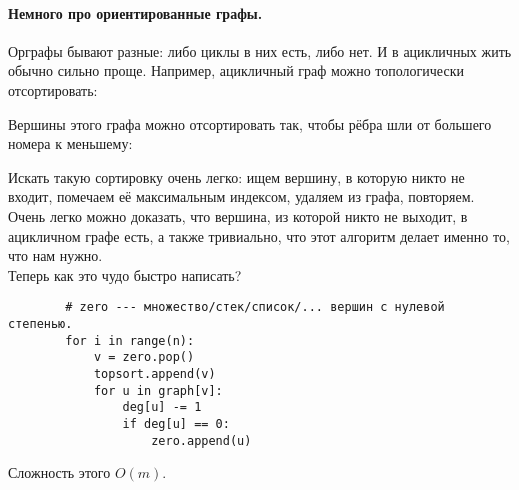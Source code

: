 \documentclass{article}
\begin{document}
    \paragraph{Немного про ориентированные графы.}
    Орграфы бывают разные: либо циклы в них есть, либо нет. И в ацикличных жить обычно сильно проще. Например, ацикличный граф можно топологически отсортировать:
    \begin{figure}[H]
    \end{figure}\noindent
    Вершины этого графа можно отсортировать так, чтобы рёбра шли от большего номера к меньшему:
    \begin{figure}[H]
    \end{figure}\noindent
    Искать такую сортировку очень легко: ищем вершину, в которую никто не входит, помечаем её максимальным индексом, удаляем из графа, повторяем.\\
    Очень легко можно доказать, что вершина, из которой никто не выходит, в ацикличном графе есть, а также тривиально, что этот алгоритм делает именно то, что нам нужно.\\
    Теперь как это чудо быстро написать?
    \begin{verbatim}
        # zero --- множество/стек/список/... вершин с нулевой степенью.
        for i in range(n):
            v = zero.pop()
            topsort.append(v)
            for u in graph[v]:
                deg[u] -= 1
                if deg[u] == 0:
                    zero.append(u)
    \end{verbatim}
    Сложность этого $O(m)$.
\end{document}
